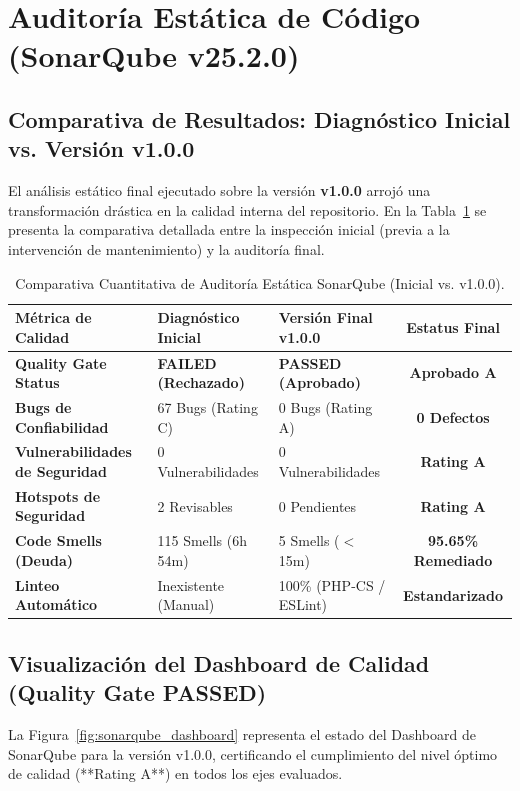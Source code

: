 \documentclass[12pt]{article}
\begin{document}
\section{Auditoría Estática de Código (SonarQube v25.2.0)}

\subsection{Comparativa de Resultados: Diagnóstico Inicial vs. Versión v1.0.0}
El análisis estático final ejecutado sobre la versión \textbf{v1.0.0} arrojó una transformación drástica en la calidad interna del repositorio. En la Tabla~\ref{tab:sonarqube_comparison} se presenta la comparativa detallada entre la inspección inicial (previa a la intervención de mantenimiento) y la auditoría final.

\begin{table}[H]
    \centering
    \caption{Comparativa Cuantitativa de Auditoría Estática SonarQube (Inicial vs. v1.0.0).}
    \label{tab:sonarqube_comparison}
    \small
    \color{black}
    \begin{tabularx}{\textwidth}{XXXc}
        \toprule
        \textbf{Métrica de Calidad} & \textbf{Diagnóstico Inicial} & \textbf{Versión Final v1.0.0} & \textbf{Estatus Final} \\
        \midrule
        \textbf{Quality Gate Status} & \textbf{FAILED (Rechazado)} & \textbf{PASSED (Aprobado)} & \textbf{Aprobado A} \\
        \rowcolor{darkcard}
        \textbf{Bugs de Confiabilidad} & 67 Bugs (Rating C) & 0 Bugs (Rating A) & \textbf{0 Defectos} \\
        \textbf{Vulnerabilidades de Seguridad} & 0 Vulnerabilidades & 0 Vulnerabilidades & \textbf{Rating A} \\
        \rowcolor{darkcard}
        \textbf{Hotspots de Seguridad} & 2 Revisables & 0 Pendientes & \textbf{Rating A} \\
        \textbf{Code Smells (Deuda)} & 115 Smells (6h 54m) & 5 Smells ($<$ 15m) & \textbf{95.65\% Remediado} \\
        \rowcolor{darkcard}
        \textbf{Linteo Automático} & Inexistente (Manual) & 100\% (PHP-CS / ESLint) & \textbf{Estandarizado} \\
        \bottomrule
    \end{tabularx}
\end{table}

\subsection{Visualización del Dashboard de Calidad (Quality Gate PASSED)}
La Figura~\ref{fig:sonarqube_dashboard} representa el estado del Dashboard de SonarQube para la versión v1.0.0, certificando el cumplimiento del nivel óptimo de calidad (**Rating A**) en todos los ejes evaluados.
\end{document}
